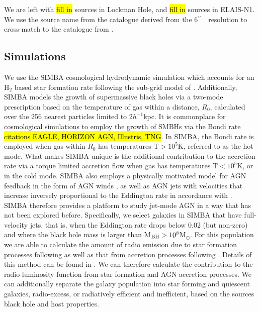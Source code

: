 \documentclass[usenatbib,fleqn,letters]{mnras}
\newcommand{\sarc}{$^{\prime\prime}\!\!$}
\begin{document}
We are left with \hl{fill in} sources in Lockman Hole, and \hl{fill in} sources in ELAIS-N1. We use the source name from the catalogue derived from the 6\sarc\ \ resolution to cross-match to the catalogue from . 

\subsection{Simulations}
\label{subsec:simba}

We use the SIMBA cosmological hydrodynamic simulation which accounts for an H$_{2}$ based star formation rate following the sub-grid model of \cite{krumholz_comparison_2011}. Additionally, SIMBA models the growth of supermassive black holes via a two-mode prescription based on the temperature of gas within a distance, $R_{0}$, calculated over the 256 nearest particles limited to 2$h^{-1}$kpc. 
It is commonplace for cosmological simulations to employ the growth of SMBHs via the Bondi rate \hl{citations EAGLE, HORIZON AGN, Illustris, TNG}. In SIMBA, the Bondi rate is employed when gas within $R_{0}$ has temperatures T$>10^{5}$K, referred to as the hot mode. What makes SIMBA unique is the additional contribution to the accretion rate via a torque limited accretion flow when gas has temperatures T$<10^{5}$K, or in the cold mode. 
SIMBA also employs a physically motivated model for AGN feedback in the form of AGN winds \citep{perna_x-raysdss_2017}, as well as AGN jets with velocities that increase inversely proportional to the Eddington rate in accordance with \cite{heckman_coevolution_2014}.
SIMBA therefore provides a platform to study jet-mode AGN in a way that has not been explored before. 
Specifically, we select galaxies in SIMBA that have full-velocity jets, that is, when the Eddington rate drops below 0.02 (but non-zero) and where the black hole mass is larger than M$_{\rm BH}>10^{8}$M$_{\odot}$. For this population we are able to calculate the amount of radio emission due to star formation processes following \cite{condon_radio_1992} as well as that from accretion processes following \cite{kording_measuring_2008}. Details of this method can be found in \cite{thomas_radio_2021}. We can therefore calculate the contribution to the radio luminosity function from star formation and AGN accretion processes. We can additionally separate the galaxy population into star forming and quiescent galaxies, radio-excess, or radiatively efficient and inefficient, based on the sources black hole and host properties.
\end{document}

